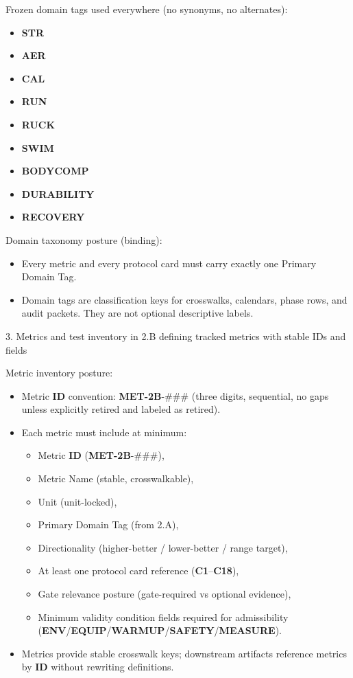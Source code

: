 \documentclass[10pt]{article}
\begin{document}
Frozen domain tags used everywhere (no synonyms, no alternates):

\begin{itemize}
\item \textbf{STR}
\item \textbf{AER}
\item \textbf{CAL}
\item \textbf{RUN}
\item \textbf{RUCK}
\item \textbf{SWIM}
\item \textbf{BODYCOMP}
\item \textbf{DURABILITY}
\item \textbf{RECOVERY}
\end{itemize}

Domain taxonomy posture (binding):

\begin{itemize}
\item Every metric and every protocol card must carry exactly one Primary Domain Tag.
\item Domain tags are classification keys for crosswalks, calendars, phase rows, and audit packets. They are not optional descriptive labels.
\end{itemize}

3. Metrics and test inventory in 2.B defining tracked metrics with stable IDs and fields

Metric inventory posture:

\begin{itemize}
\item Metric \textbf{ID} convention: \textbf{MET-2B}-\#\#\# (three digits, sequential, no gaps unless explicitly retired and labeled as retired).
\item Each metric must include at minimum:
  \begin{itemize}
  \item Metric \textbf{ID} (\textbf{MET-2B}-\#\#\#),
  \item Metric Name (stable, crosswalkable),
  \item Unit (unit-locked),
  \item Primary Domain Tag (from 2.A),
  \item Directionality (higher-better / lower-better / range target),
  \item At least one protocol card reference (\textbf{C1}–\textbf{C18}),
  \item Gate relevance posture (gate-required vs optional evidence),
  \item Minimum validity condition fields required for admissibility (\textbf{ENV}/\textbf{EQUIP}/\textbf{WARMUP}/\textbf{SAFETY}/\textbf{MEASURE}).
  \end{itemize}
\item Metrics provide stable crosswalk keys; downstream artifacts reference metrics by \textbf{ID} without rewriting definitions.
\end{itemize}
\end{document}

